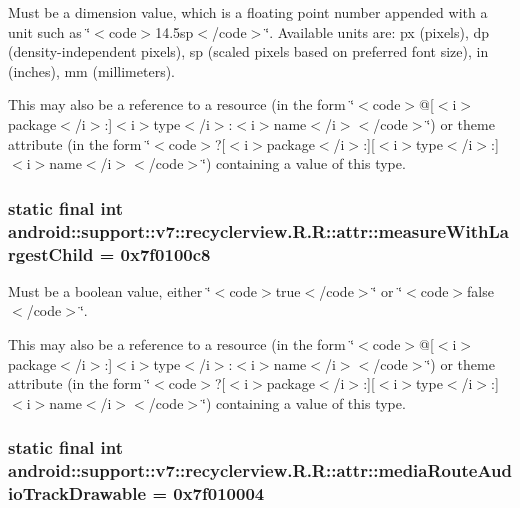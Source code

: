 Must be a dimension value, which is a floating point number appended with a unit such as \char`\"{}$<$code$>$14.5sp$<$/code$>$\char`\"{}. Available units are: px (pixels), dp (density-independent pixels), sp (scaled pixels based on preferred font size), in (inches), mm (millimeters). 

This may also be a reference to a resource (in the form \char`\"{}$<$code$>$@\mbox{[}$<$i$>$package$<$/i$>$:\mbox{]}$<$i$>$type$<$/i$>$:$<$i$>$name$<$/i$>$$<$/code$>$\char`\"{}) or theme attribute (in the form \char`\"{}$<$code$>$?\mbox{[}$<$i$>$package$<$/i$>$:\mbox{]}\mbox{[}$<$i$>$type$<$/i$>$:\mbox{]}$<$i$>$name$<$/i$>$$<$/code$>$\char`\"{}) containing a value of this type. \hypertarget{classandroid_1_1support_1_1v7_1_1recyclerview_1_1_r_1_1attr_6d372c63844ad4adc796e01614524ca8}{
\subsubsection[{measureWithLargestChild}]{\setlength{\rightskip}{0pt plus 5cm}static final int android::support::v7::recyclerview.R.R::attr::measureWithLargestChild = 0x7f0100c8}}
\label{classandroid_1_1support_1_1v7_1_1recyclerview_1_1_r_1_1attr_6d372c63844ad4adc796e01614524ca8}


Must be a boolean value, either \char`\"{}$<$code$>$true$<$/code$>$\char`\"{} or \char`\"{}$<$code$>$false$<$/code$>$\char`\"{}. 

This may also be a reference to a resource (in the form \char`\"{}$<$code$>$@\mbox{[}$<$i$>$package$<$/i$>$:\mbox{]}$<$i$>$type$<$/i$>$:$<$i$>$name$<$/i$>$$<$/code$>$\char`\"{}) or theme attribute (in the form \char`\"{}$<$code$>$?\mbox{[}$<$i$>$package$<$/i$>$:\mbox{]}\mbox{[}$<$i$>$type$<$/i$>$:\mbox{]}$<$i$>$name$<$/i$>$$<$/code$>$\char`\"{}) containing a value of this type. \hypertarget{classandroid_1_1support_1_1v7_1_1recyclerview_1_1_r_1_1attr_d43bcae75539b2c1fc4d2b8dc0d78d5d}{
\subsubsection[{mediaRouteAudioTrackDrawable}]{\setlength{\rightskip}{0pt plus 5cm}static final int android::support::v7::recyclerview.R.R::attr::mediaRouteAudioTrackDrawable = 0x7f010004}}
\label{classandroid_1_1support_1_1v7_1_1recyclerview_1_1_r_1_1attr_d43bcae75539b2c1fc4d2b8dc0d78d5d}


